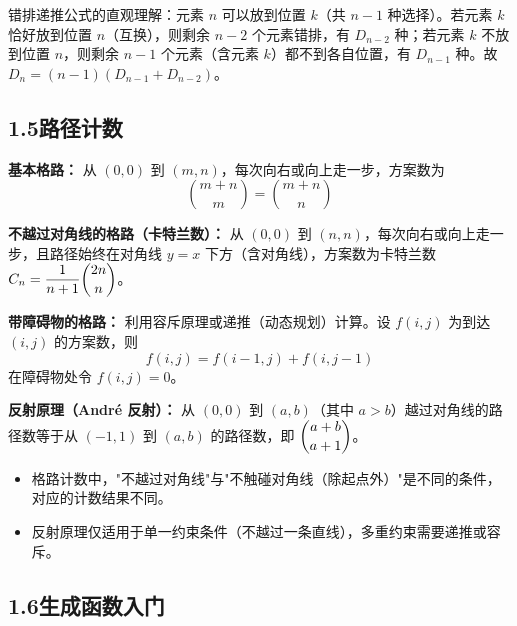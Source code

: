 \documentclass[12pt, a4paper]{ctexart}
\begin{document}
\begin{tipbox}[规律]
错排递推公式的直观理解：元素 \(n\) 可以放到位置 \(k\)（共 \(n-1\) 种选择）。若元素 \(k\) 恰好放到位置 \(n\)（互换），则剩余 \(n-2\) 个元素错排，有 \(D_{n-2}\) 种；若元素 \(k\) 不放到位置 \(n\)，则剩余 \(n-1\) 个元素（含元素 \(k\)）都不到各自位置，有 \(D_{n-1}\) 种。故 \(D_n = (n-1)(D_{n-1}+D_{n-2})\)。
\end{tipbox}

\subsection*{1.5\quad 路径计数}

\begin{knowledgebox}[格路计数]
\textbf{基本格路：} 从 \((0,0)\) 到 \((m,n)\)，每次向右或向上走一步，方案数为
\[
\binom{m+n}{m} = \binom{m+n}{n}
\]

\textbf{不越过对角线的格路（卡特兰数）：} 从 \((0,0)\) 到 \((n,n)\)，每次向右或向上走一步，且路径始终在对角线 \(y=x\) 下方（含对角线），方案数为卡特兰数 \(C_n = \dfrac{1}{n+1}\dbinom{2n}{n}\)。

\textbf{带障碍物的格路：} 利用容斥原理或递推（动态规划）计算。设 \(f(i,j)\) 为到达 \((i,j)\) 的方案数，则
\[
f(i,j) = f(i-1,j) + f(i,j-1)
\]
在障碍物处令 \(f(i,j)=0\)。

\textbf{反射原理（Andr\'{e} 反射）：} 从 \((0,0)\) 到 \((a,b)\)（其中 \(a>b\)）越过对角线的路径数等于从 \((-1,1)\) 到 \((a,b)\) 的路径数，即 \(\dbinom{a+b}{a+1}\)。
\end{knowledgebox}

\begin{warnbox}[易错提醒]
\begin{itemize}[leftmargin=1.5em]
  \item 格路计数中，"不越过对角线"与"不触碰对角线（除起点外）"是不同的条件，对应的计数结果不同。
  \item 反射原理仅适用于单一约束条件（不越过一条直线），多重约束需要递推或容斥。
\end{itemize}
\end{warnbox}

\subsection*{1.6\quad 生成函数入门}
\end{document}
